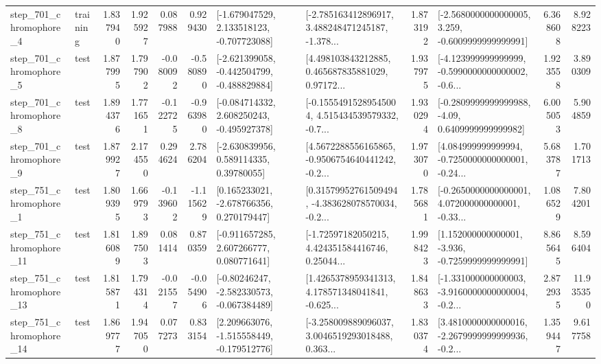 \begin{tabular}{llrrrrllrlrr}
   step\_701\_chromophore\_4 &  training &      1.837940 &    1.925927 &      0.087988 &  0.929430 &   [-1.679047529, 2.133518123, -0.707723088] &  [-2.785163412896917, 3.488248471245187, -1.378... &       1.873192 &  [-2.5680000000000005, 3.259, -0.6009999999999991] &            6.368608 &          8.928223 \\
   step\_701\_chromophore\_5 &      test &      1.877995 &    1.797902 &     -0.080092 & -0.580890 &  [-2.621399058, -0.442504799, -0.488829884] &  [4.498103843212885, 0.465687835881029, 0.97172... &       1.937975 &  [-4.123999999999999, -0.5990000000000002, -0.6... &            1.923558 &          3.890309 \\
   step\_701\_chromophore\_8 &      test &      1.894376 &    1.771651 &     -0.122725 & -0.963980 &   [-0.084714332, 2.608250243, -0.495927378] &  [-0.15554915289545004, 4.515434539579332, -0.7... &       1.930294 &   [-0.2809999999999988, -4.09, 0.6409999999999982] &            6.005053 &          5.904859 \\
   step\_701\_chromophore\_9 &      test &      1.879927 &    2.174550 &      0.294624 &  2.786204 &     [-2.630839956, 0.589114335, 0.39780055] &  [4.5672288556165865, -0.9506754640441242, -0.2... &       1.973070 &  [4.084999999999994, -0.7250000000000001, -0.24... &            5.683787 &          1.701713 \\
   step\_751\_chromophore\_1 &      test &      1.809395 &    1.669793 &     -0.139602 & -1.115629 &    [0.165233021, -2.678766356, 0.270179447] &  [0.31579952761509494, -4.383628078570034, -0.2... &       1.785681 &  [-0.2650000000000001, 4.072000000000001, -0.33... &            1.086529 &          7.804201 \\
  step\_751\_chromophore\_11 &      test &      1.816089 &    1.897503 &      0.081414 &  0.870359 &    [-0.911657285, 2.607266777, 0.080771641] &  [-1.72597182050215, 4.424351584416746, 0.25044... &       1.998423 &   [1.152000000000001, -3.936, -0.7259999999999991] &            8.865645 &          8.596404 \\
  step\_751\_chromophore\_13 &      test &      1.815871 &    1.794314 &     -0.021557 & -0.054906 &   [-0.80246247, -2.582330573, -0.067384489] &  [1.4265378959341313, 4.178571348041841, -0.625... &       1.848633 &  [-1.331000000000003, -3.9160000000000004, -0.2... &            2.872935 &         11.935350 \\
  step\_751\_chromophore\_14 &      test &      1.869777 &    1.947050 &      0.077273 &  0.833154 &   [2.209663076, -1.515558449, -0.179512776] &  [-3.258009889096037, 3.0046519293018488, 0.363... &       1.830374 &  [3.4810000000000016, -2.2679999999999936, -0.2... &            1.359447 &          9.617758 \\

\end{tabular}
